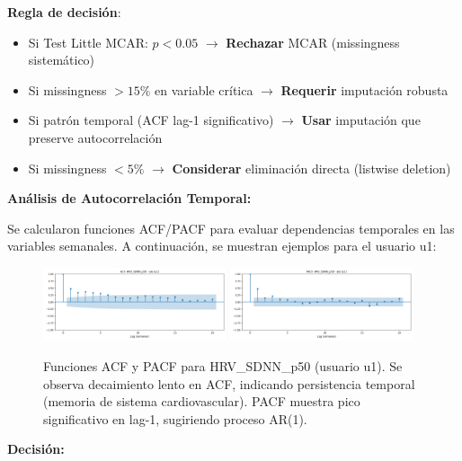 \documentclass[12pt,letterpaper,twoside]{report}
\begin{document}
\begin{calculobox}
\begin{reglabox}
\textbf{Regla de decisión}:

\begin{itemize}[noitemsep]
    \item Si Test Little MCAR: $p < 0.05$ $\to$ \textbf{Rechazar} MCAR (missingness sistemático)
    \item Si missingness $> 15\%$ en variable crítica $\to$ \textbf{Requerir} imputación robusta
    \item Si patrón temporal (ACF lag-1 significativo) $\to$ \textbf{Usar} imputación que preserve autocorrelación
    \item Si missingness $< 5\%$ $\to$ \textbf{Considerar} eliminación directa (listwise deletion)
\end{itemize}
\end{reglabox}

\begin{calculobox}
\textbf{Análisis de Autocorrelación Temporal:}

Se calcularon funciones ACF/PACF para evaluar dependencias temporales en las variables semanales. A continuación, se muestran ejemplos para el usuario u1:

\begin{figure}[htbp]
\centering
\includegraphics[width=0.48\textwidth]{../analisis_u/missingness_y_acf/acf_plots/acf_HRV_SDNN_p50_u1.png}
\includegraphics[width=0.48\textwidth]{../analisis_u/missingness_y_acf/pacf_plots/pacf_HRV_SDNN_p50_u1.png}
\caption{Funciones ACF y PACF para HRV\_SDNN\_p50 (usuario u1). Se observa decaimiento lento en ACF, indicando persistencia temporal (memoria de sistema cardiovascular). PACF muestra pico significativo en lag-1, sugiriendo proceso AR(1).}
\label{fig:acf_pacf_hrv_u1}
\end{figure}
\end{calculobox}

\begin{decisionbox}
\textbf{Decisión:}


\end{decisionbox}
\end{calculobox}
\end{document}
